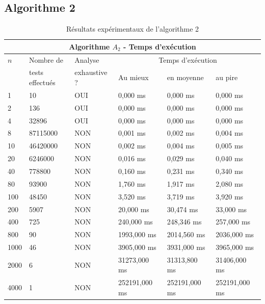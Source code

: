 \subsection{Algorithme 2}
\begin{table}[p]
{%
\begin{center}
\begin{tabular}{||p{1cm}||p{2.5cm}|p{2.5cm}|p{2.5cm}|p{2.5cm}|p{2.5cm}||}
\hline\hline
\multicolumn{6}{||c||}{Algorithme $A_2$ - Temps d'exécution}\\\hline\hline
$n$ & Nombre de & Analyse& \multicolumn{3}{c||}{Temps d'exécution}\\
& tests effectués & exhaustive ?  &Au mieux&en moyenne&au pire\\\hline\hline

1 & 10 & OUI & 0,000 ms & 0,000 ms & 0,000 ms\\
2 & 136 & OUI & 0,000 ms & 0,000 ms & 0,000 ms\\
4 & 32896 & OUI & 0,000 ms & 0,000 ms & 0,000 ms\\
8 &  87115000 & NON & 0,001 ms & 0,002 ms & 0,004 ms\\
10 & 46420000 & NON & 0,002 ms & 0,004 ms & 0,005 ms\\
20 & 6246000 & NON & 0,016 ms & 0,029 ms & 0,040 ms\\
40 & 778800 & NON & 0,160 ms & 0,231 ms & 0,340 ms\\
80 & 93900 & NON & 1,760 ms & 1,917 ms & 2,080 ms\\
100 & 48450 & NON & 3,520 ms & 3,719 ms & 3,920 ms\\
200 & 5907 & NON & 20,000 ms & 30,474 ms & 33,000 ms\\
400 & 725 & NON & 240,000 ms & 248,346 ms & 257,000 ms\\
800 & 90 & NON & 1993,000 ms & 2014,560 ms & 2036,000 ms\\
1000 & 46 & NON & 3905,000 ms & 3931,000 ms & 3965,000 ms\\
2000 & 6 & NON & 31273,000 ms & 31313,800 ms & 31406,000 ms\\
4000 & 1 & NON & 252191,000 ms & 252191,000 ms & 252191,000 ms\\\hline\hline
\end{tabular}

\caption{Résultats expérimentaux de l'algorithme 2}

\label{tab2}
\end{center}
}%
\end{table}

